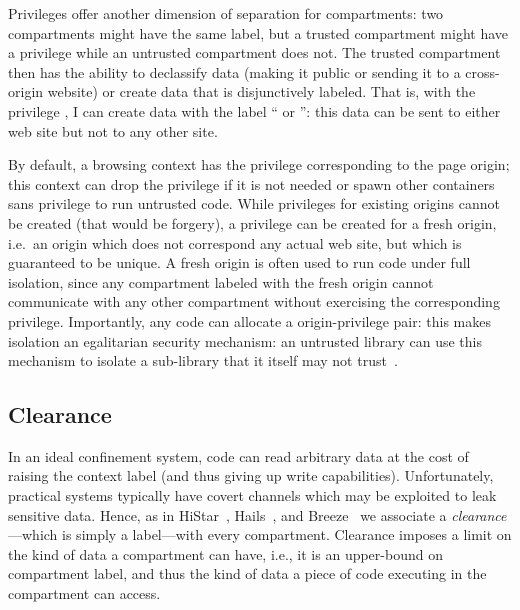 Privileges offer another dimension of separation for compartments: two
compartments might have the same label, but a trusted compartment might
have a privilege while an untrusted compartment does not.
%
The trusted compartment then has the ability to declassify data (making
it public or sending it to a cross-origin website) or create data
that is disjunctively labeled.
%
That is, with the privilege , I can create data with
the label `` or '': this
data can be sent to either web site but not to any other site.

By default, a browsing context has the privilege corresponding to the
page origin; this context can drop the privilege if it is not
needed or spawn other containers sans privilege to run untrusted code.
%
While privileges for existing origins cannot be created (that would be
forgery), a privilege can be created for a fresh origin, i.e.\ an origin
which does not correspond any actual web site, but which is guaranteed
to be unique.
%
A fresh origin is often used to run code under full isolation, since any
compartment labeled with the fresh origin cannot communicate with any
other compartment without exercising the corresponding privilege.
%
Importantly, any code can allocate a origin-privilege pair: this
makes isolation an egalitarian security mechanism: an untrusted library
can use this mechanism to isolate a sub-library that it itself
may not trust~\cite{Zeldovich:2006}.

\subsection{Clearance}

In an ideal confinement system, code can read arbitrary data at the
cost of raising the context label (and thus giving up write
capabilities).
%
Unfortunately, practical systems typically have covert channels which
may be exploited to leak sensitive data.
%
Hence, as in HiStar~\cite{Zeldovich:2006}, Hails~\cite{giffin:2012:hails}, and
Breeze~\cite{Breeze13} we associate a \emph{clearance}---which is
simply a label---with every compartment.
%
Clearance imposes a limit on the kind of data a compartment can have,
i.e., it is an upper-bound on compartment label, and thus the kind of
data a piece of code executing in the compartment can access.


